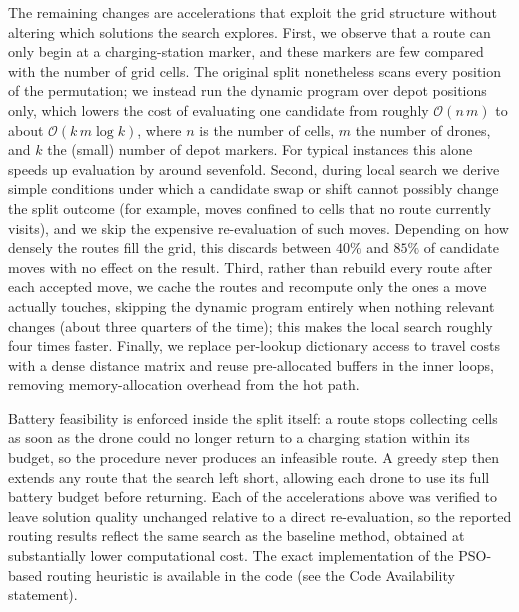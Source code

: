 The remaining changes are accelerations that exploit the grid structure without
altering which solutions the search explores. First, we observe that a route can
only begin at a charging-station marker, and these markers are few compared with
the number of grid cells. The original split nonetheless scans every position of
the permutation; we instead run the dynamic program over depot positions only,
which lowers the cost of evaluating one candidate from roughly $\mathcal{O}(n\,m)$
to about $\mathcal{O}(k\,m \log k)$, where $n$ is the number of cells, $m$ the
number of drones, and $k$ the (small) number of depot markers. For typical
instances this alone speeds up evaluation by around sevenfold. Second, during local
search we derive simple conditions under which a candidate swap or shift cannot
possibly change the split outcome (for example, moves confined to cells that no
route currently visits), and we skip the expensive re-evaluation of such moves.
Depending on how densely the routes fill the grid, this discards between $40\%$ and
$85\%$ of candidate moves with no effect on the result. Third, rather than rebuild
every route after each accepted move, we cache the routes and recompute only the
ones a move actually touches, skipping the dynamic program entirely when nothing
relevant changes (about three quarters of the time); this makes the local search
roughly four times faster. Finally, we replace per-lookup dictionary access to
travel costs with a dense distance matrix and reuse pre-allocated buffers in the
inner loops, removing memory-allocation overhead from the hot path.

Battery feasibility is enforced inside the split itself: a route stops collecting
cells as soon as the drone could no longer return to a charging station within its
budget, so the procedure never produces an infeasible route. A greedy step then
extends any route that the search left short, allowing each drone to use its full
battery budget before returning. Each of the accelerations above was verified to
leave solution quality unchanged relative to a direct re-evaluation, so the reported
routing results reflect the same search as the baseline method, obtained at
substantially lower computational cost. The exact implementation of the PSO-based routing heuristic is available in the code (see the Code Availability statement).
